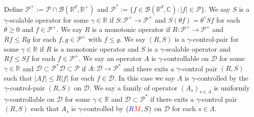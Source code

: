 \documentclass[12pt,oneside,english]{amsart}
\theoremstyle{plain}
\theoremstyle{definition}
\numberwithin{equation}{section}
\newcommand{\added}[1]{{\color{blue}#1}}\newcommand{\deleted}[1]{{\color{red}#1}}
\begin{document}
\subsection{}
    Define $\mathcal P^+:= \mathcal P \cap \mathcal B(\mathbb R^d, \mathbb R^+)$ and $\mathcal P^*:= \{f\in \mathscr B(\mathbb R^d, \mathbb C): |f|\in \mathcal P\}$.
    We say $S$ is a $\gamma$-scalable operator for some $\gamma\in \mathbb R$ if $S: \mathcal P^+ \to \mathcal P^+$ and $S(\theta f) = \theta^\gamma Sf$ for each $\theta \geq 0$ and $f \in \mathcal P^+$.
    We say $R$ is a monotonic operator if $R:\mathcal P^+ \to \mathcal P^+$ and $Rf \leq Rg$ for each $f, g \in \mathcal P^+$ with $f\leq g$.
    We say $(R,S)$ is a $\gamma$-control-pair for some $\gamma \in \mathbb R$ if $R$ is a monotonic operator and $S$ is a $\gamma$-scalable operator and $Rf\leq Sf$ for each $f\in \mathcal P^+$.
    We say an operator $A$ is $\gamma$-controllable on $\mathcal D$ for some $\gamma \in \mathbb R$ and \added{$\mathcal D \subset \mathcal P^*$}\deleted{$\mathcal D \subset \mathcal P$} if $A: \mathcal D \to \mathcal P^*$ and there exits a $\gamma$-control pair $(R,S)$ such that $|Af|\leq R|f|$ for each $f\in \mathcal D$.
    In this case we say $A$ is $\gamma$-controlled by the $\gamma$-control-pair $(R,S)$ on $\mathcal D$.
    We say a family of operator $(A_s)_{s\in \Lambda}$ is uniformly $\gamma$-controllable on $\mathcal D$ for some $\gamma \in \mathbb R$ and $\mathcal D \subset \mathcal P^*$ if there exits a $\gamma$-control pair $(R,S)$ such that $A_s$ is $\gamma$-controlled by $(\added{R}\deleted{M}, S)$ on $\mathcal D$ for each $s\in \Lambda$.
\end{document}
